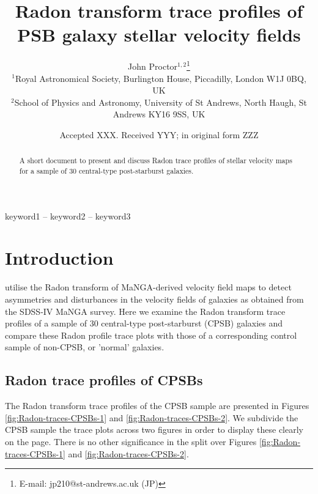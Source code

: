 \documentclass[fleqn,usenatbib]{mnras}
\title[Radon trace profiles of PSB galaxies]{Radon transform trace profiles of PSB galaxy stellar velocity fields}
\author[John Proctor]{
John Proctor$^{1,2}$\thanks{E-mail: jp210@st-andrews.ac.uk (JP)}
\\
$^{1}$Royal Astronomical Society, Burlington House, Piccadilly, London W1J 0BQ, UK\\
$^{2}$School of Physics and Astronomy, University of St Andrews, North Haugh, St Andrews KY16 9SS, UK\\
}
\date{Accepted XXX. Received YYY; in original form ZZZ}
\begin{document}
\label{firstpage}
\pagerange{\pageref{firstpage}--\pageref{lastpage}}
\maketitle

\begin{abstract}
A short document to present and discuss Radon trace profiles of stellar velocity maps for a sample of 30 central-type post-starburst galaxies. 
\end{abstract}

\begin{keywords}
keyword1 -- keyword2 -- keyword3
\end{keywords}


\section{Introduction}

\citet{2018MNRAS.480.2217S} utilise the Radon transform of MaNGA-derived velocity field maps to detect asymmetries and disturbances in the velocity fields of galaxies as obtained from the SDSS-IV MaNGA survey. Here we examine the Radon transform trace profiles of a sample of 30 central-type post-starburst (CPSB) galaxies and compare these Radon profile trace plots with those of a corresponding control sample of non-CPSB, or 'normal' galaxies.

\subsection{Radon trace profiles of CPSBs}

The Radon transform trace profiles of the CPSB sample are presented in Figures \ref{fig:Radon-traces-CPSBs-1} and \ref{fig:Radon-traces-CPSBs-2}. We subdivide the CPSB sample the trace plots across two figures in order to display these clearly on the page. There is no other significance in the split over Figures \ref{fig:Radon-traces-CPSBs-1} and \ref{fig:Radon-traces-CPSBs-2}.
\end{document}
